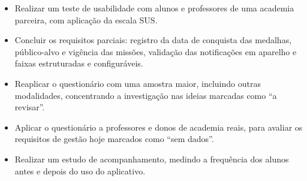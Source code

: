 \begin{itemize}
  \item Realizar um teste de usabilidade com alunos e professores de uma
        academia parceira, com aplicação da escala SUS.
  \item Concluir os requisitos parciais: registro da data de conquista
        das medalhas, público-alvo e vigência das missões, validação das
        notificações em aparelho e faixas estruturadas e configuráveis.
  \item Reaplicar o questionário com uma amostra maior, incluindo
        outras modalidades, concentrando a investigação nas ideias marcadas
        como ``a revisar''.
  \item Aplicar o questionário a professores e donos de academia reais,
        para avaliar os requisitos de gestão hoje marcados como ``sem
        dados''.
  \item Realizar um estudo de acompanhamento, medindo a frequência dos
        alunos antes e depois do uso do aplicativo.
\end{itemize}
